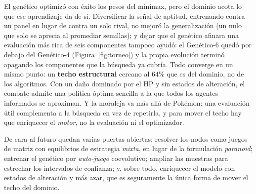 \documentclass[11pt]{article}
\begin{document}
El genético optimizó con éxito los pesos del minimax, pero el dominio acota lo que
ese aprendizaje da de sí. Diversificar la señal de aptitud, entrenando contra un
panel en lugar de contra un solo rival, no mejoró la generalización (un nulo que
solo se aprecia al promediar semillas); y dejar que el genético afinara una
evaluación más rica de seis componentes tampoco ayudó: el Genético-6 quedó por
debajo del Genético-4 (Figura~\ref{fig:torneo}) y la propia evolución terminó
apagando los componentes que la búsqueda ya cubría. Todo converge en un mismo punto:
un \textbf{techo estructural} cercano al $64\%$ que es del dominio, no de los
algoritmos. Con un daño dominado por el HP y sin estados de alteración, el combate
admite una política óptima sencilla a la que todos los agentes informados se
aproximan. Y la moraleja va más allá de Pokémon: una evaluación útil complementa a
la búsqueda en vez de repetirla, y para mover el techo hay que enriquecer el
\emph{motor}, no la evaluación ni el optimizador.

De cara al futuro quedan varias puertas abiertas: resolver los nodos como juegos de
matriz con equilibrios de estrategia \emph{mixta}, en lugar de la formulación
\emph{paranoid}; entrenar el genético por \emph{auto-juego} coevolutivo; ampliar las
muestras para estrechar los intervalos de confianza; y, sobre todo, enriquecer el
modelo con estados de alteración y más azar, que es seguramente la única forma de
mover el techo del dominio.


\end{document}

